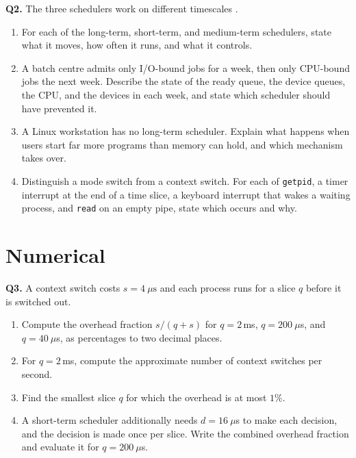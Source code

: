 \documentclass[11pt]{article}
\begin{document}
\textbf{Q2.} The three schedulers work on different timescales \cite{SilberschatzOSC_operating_system_concepts,StallingsOS_internals_design_principles}.
\begin{enumerate}
  \item[(a)] For each of the long-term, short-term, and medium-term schedulers, state what it moves, how often it runs, and what it controls.
  \item[(b)] A batch centre admits only I/O-bound jobs for a week, then only CPU-bound jobs the next week. Describe the state of the ready queue, the device queues, the CPU, and the devices in each week, and state which scheduler should have prevented it.
  \item[(c)] A Linux workstation has no long-term scheduler. Explain what happens when users start far more programs than memory can hold, and which mechanism takes over.
  \item[(d)] Distinguish a mode switch from a context switch. For each of \texttt{getpid}, a timer interrupt at the end of a time slice, a keyboard interrupt that wakes a waiting process, and \texttt{read} on an empty pipe, state which occurs and why.
\end{enumerate}

\section{Numerical}

\textbf{Q3.} A context switch costs $s = 4\ \mu\text{s}$ and each process runs for a slice $q$ before it is switched out.
\begin{enumerate}
  \item[(a)] Compute the overhead fraction $s/(q+s)$ for $q = 2$\,ms, $q = 200\ \mu$s, and $q = 40\ \mu$s, as percentages to two decimal places.
  \item[(b)] For $q = 2$\,ms, compute the approximate number of context switches per second.
  \item[(c)] Find the smallest slice $q$ for which the overhead is at most $1\%$.
  \item[(d)] A short-term scheduler additionally needs $d = 16\ \mu$s to make each decision, and the decision is made once per slice. Write the combined overhead fraction and evaluate it for $q = 200\ \mu$s.
\end{enumerate}
\end{document}

